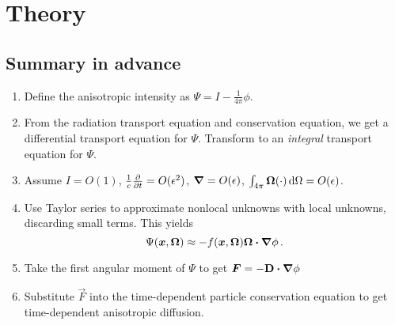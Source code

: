\documentclass{beamer}
\begin{document}
\section{Theory}
\subsection{Summary in advance}
\begin{frame}
\begin{enumerate}
  \item Define the anisotropic intensity as $\Psi = I -
    \frac{1}{4\pi}\phi$.
  \item From the radiation transport equation and conservation equation, we get
    a differential transport equation for $\Psi$.
    Transform to an \emph{integral} transport equation for $\Psi$.
  \item Assume $I=O(1)$, $\frac1c\frac{\partial }{\partial t}=O(\epsilon^2)$, $\bm{\nabla} =
    O(\epsilon)$, $\int_{4\pi} \bm{\Omega} (\cdot) \mathop{}\!\mathrm{d}\Omega = O(\epsilon)$.
  \item Use Taylor series to approximate nonlocal unknowns with local
    unknowns, discarding small terms. This yields
    \begin{equation*}
      \Psi(\bm{x}, \bm{\Omega})
      \approx - f(\bm{x}, \bm{\Omega})  \bm{\Omega} \bm{\cdot} \bm{\nabla} \phi\,.
    \end{equation*}
  \item Take the first angular moment of $\Psi$ to get
    $\bm{F}=-\mathbf{D} \bm{\cdot} \bm{\nabla} \phi$
  \item Substitute $\vec{F}$ into the time-dependent particle
    conservation equation to get time-dependent anisotropic diffusion.
\end{enumerate}
\end{frame}
\end{document}
